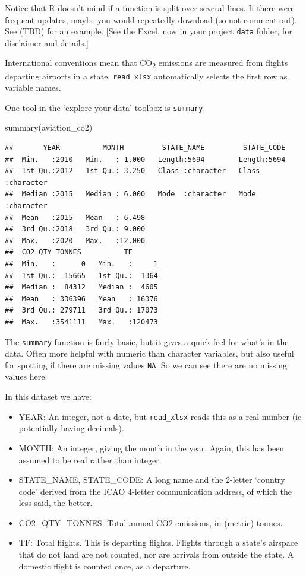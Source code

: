 \documentclass[
]{book}
\newenvironment{Shaded}{\begin{snugshade}}{\end{snugshade}}
\newcommand{\FunctionTok}[1]{\textcolor[rgb]{0.00,0.00,0.00}{#1}}
\newcommand{\NormalTok}[1]{#1}
\providecommand{\tightlist}{%
  \setlength{\itemsep}{0pt}\setlength{\parskip}{0pt}}
\begin{document}
Notice that R doesn't mind if a function is split over several lines. If there were frequent updates, maybe you would repeatedly download (so not comment out). See (TBD) for an example. {[}See the Excel, now in your project \texttt{data} folder, for disclaimer and details.{]}

International conventions mean that CO\textsubscript{2} emissions are measured from flights departing airports in a state. \texttt{read\_xlsx} automatically selects the first row as variable names.

One tool in the `explore your data' toolbox is \texttt{summary}.

\begin{Shaded}
\begin{Highlighting}[]
\FunctionTok{summary}\NormalTok{(aviation\_co2)}
\end{Highlighting}
\end{Shaded}

\begin{verbatim}
##       YEAR          MONTH         STATE_NAME         STATE_CODE       
##  Min.   :2010   Min.   : 1.000   Length:5694        Length:5694       
##  1st Qu.:2012   1st Qu.: 3.250   Class :character   Class :character  
##  Median :2015   Median : 6.000   Mode  :character   Mode  :character  
##  Mean   :2015   Mean   : 6.498                                        
##  3rd Qu.:2018   3rd Qu.: 9.000                                        
##  Max.   :2020   Max.   :12.000                                        
##  CO2_QTY_TONNES          TF        
##  Min.   :      0   Min.   :     1  
##  1st Qu.:  15665   1st Qu.:  1364  
##  Median :  84312   Median :  4605  
##  Mean   : 336396   Mean   : 16376  
##  3rd Qu.: 279711   3rd Qu.: 17073  
##  Max.   :3541111   Max.   :120473
\end{verbatim}

The \texttt{summary} function is fairly basic, but it gives a quick feel for what's in the data. Often more helpful with numeric than character variables, but also useful for spotting if there are missing values \texttt{NA}. So we can see there are no missing values here.

In this dataset we have:

\begin{itemize}
\tightlist
\item
  YEAR: An integer, not a date, but \texttt{read\_xlsx} reads this as a real number (ie potentially having decimals).
\item
  MONTH: An integer, giving the month in the year. Again, this has been assumed to be real rather than integer.
\item
  STATE\_NAME, STATE\_CODE: A long name and the 2-letter `country code' derived from the ICAO 4-letter communication address, of which the less said, the better.
\item
  CO2\_QTY\_TONNES: Total annual CO2 emissions, in (metric) tonnes.
\item
  TF: Total flights. This is departing flights. Flights through a state's airspace that do not land are not counted, nor are arrivals from outside the state. A domestic flight is counted once, as a departure.
\end{itemize}
\end{document}

